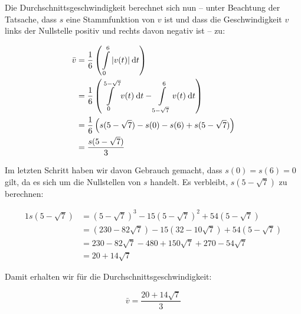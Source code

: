 Die Durchschnittsgeschwindigkeit berechnet sich nun -- unter Beachtung der Tatsache, dass $s$ eine Stammfunktion von $v$ ist und dass die Geschwindigkeit $v$ links der Nullstelle positiv und rechts davon negativ ist -- zu:

\begin{alignat*}{1}
	\bar{v} &= \frac{1}{6} \left( \int\limits_0^6 |v(t)| \:\mathrm{d}{t} \right) \\
	        &= \frac{1}{6} \left( \int\limits_0^{5-\sqrt{7}} v(t) \:\mathrm{d}{t} - \int\limits_{5-\sqrt{7}}^6 v(t) \:\mathrm{d}{t} \right) \\
	        &= \frac{1}{6} \left( s(5-\sqrt{7}) -s(0) - s(6) + s(5-\sqrt{7}) \right) \\
	        &= \frac{s(5-\sqrt{7})}{3}
\end{alignat*}

Im letzten Schritt haben wir davon Gebrauch gemacht, dass $s(0)=s(6)=0$ gilt, da es sich um die Nullstellen von $s$ handelt. Es verbleibt, $s(5-\sqrt{7})$ zu berechnen:

\begin{alignat*}{1}
	s(5-\sqrt{7}) &= (5-\sqrt{7})^3 -15 (5-\sqrt{7})^2+54(5-\sqrt{7}) \\
	              &= (230-82\sqrt{7}) -15(32-10\sqrt{7})+54(5-\sqrt{7}) \\
	              &= 230-82\sqrt{7}-480+150\sqrt{7}+270-54\sqrt{7} \\
	              &= 20+14\sqrt{7}
\end{alignat*}

Damit erhalten wir für die Durchschnittsgeschwindigkeit:

$$
	\bar{v} = \frac{20+14\sqrt{7}}{3}
$$
